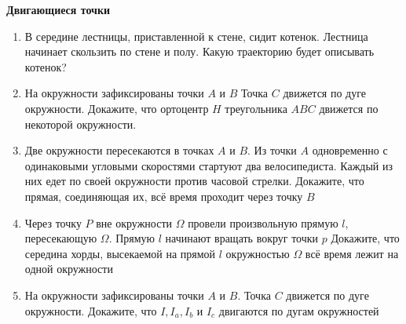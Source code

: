 \documentclass{article}
\begin{document}
\large



\begin{center}
\textbf{Двигающиеся точки}
\end{center}

\begin{enumerate}[label*=\protect\fbox{\arabic{enumi}}]

\item В середине лестницы, приставленной к стене, сидит котенок. Лестница начинает
скользить по стене и полу. Какую траекторию будет описывать котенок?

\item На окружности зафиксированы точки $A$ и $B$ Точка $C$ движется по дуге окружности. Докажите, что ортоцентр $H$ треугольника $ABC$ движется по некоторой окружности.

\item Две окружности пересекаются в точках $A$ и $B$. Из точки $A$ одновременно с одинаковыми угловыми скоростями стартуют два велосипедиста. Каждый из них едет по
своей окружности против часовой стрелки. Докажите, что прямая, соединяющая их,
всё время проходит через точку $B$

\item Через точку $P$ вне окружности $\Omega$ провели произвольную прямую $l$, пересекающую $\Omega$. Прямую $l$ начинают вращать вокруг точки $p$ Докажите, что середина хорды, высекаемой на прямой $l$ окружностью $\Omega$ всё время лежит на одной окружности

\item
На окружности зафиксированы точки $A$ и $B$. Точка $C$ движется по дуге окружности. 
Докажите, что $I, I_a, I_b$ и $I_c$ двигаются по дугам окружностей

\end{enumerate}
\end{document}
